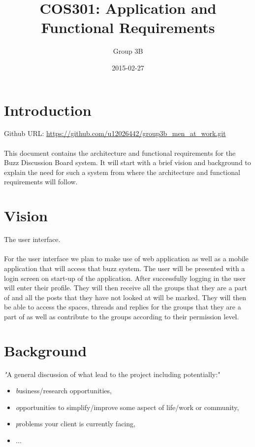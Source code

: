 \documentclass[a4paper, 10pt, oneside]{report}
\title{COS301: Application and Functional Requirements}
\date{2015-02-27}
\author{Group 3B}
\begin{document}
\maketitle
{}

\newpage
{}

\tableofcontents 

\newpage
{}


\chapter{Introduction}

Github URL: \url{https://github.com/u12026442/group3b_men_at_work.git}
\\
\\
This document contains the architecture and functional requirements for the Buzz Discussion Board system. It will start with a brief  vision and background to explain the need for such a system from where the architecture and functional requirements will follow.


\chapter{Vision}

The user interface.
\\
\\
For the user interface we plan to make use of web application as well as a mobile application that will access that buzz system. The user will be presented with a login screen on start-up of the application. After successfully logging in the user will enter their profile. They will then receive all the groups that they are a part of and all the posts that they have not looked at will be marked. They will then be able to access the spaces, threads and replies for the groups that they are a part of as well as contribute to the groups according to their permission level.

\chapter{Background}

\textit "A general discussion of what lead to the project including potentially:"

\begin{itemize}
\item \textit business/research opportunities,
\item \textit opportunities to simplify/improve some aspect of life/work or community,
\item \textit problems your client is currently facing,
\item \textit ...
\end{itemize}
\end{document}
